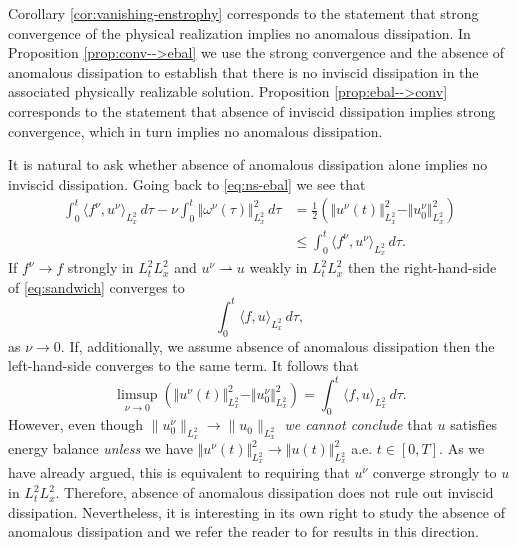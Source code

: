 \documentclass[reqno,12pt]{amsart}
\begin{document}
\begin{remark} \label{rem:invdissANDnoanomdiss}
Corollary \ref{cor:vanishing-enstrophy} corresponds to the statement that strong convergence of the physical realization implies no anomalous dissipation. In Proposition \ref{prop:conv-->ebal} we use the strong convergence and the absence of anomalous dissipation to establish that there is no inviscid dissipation in the associated physically realizable solution. Proposition \ref{prop:ebal-->conv} corresponds to the statement that absence of inviscid dissipation implies strong convergence, which in turn implies no anomalous dissipation.

It is natural to ask whether absence of anomalous dissipation alone implies no inviscid dissipation. Going back to \eqref{eq:ns-ebal} we see that
\begin{align} \label{eq:sandwich}
\int_0^t \langle f^\nu, u^\nu \rangle_{L^2_x} \, d\tau  - \nu \int_0^t \Vert \omega^\nu(\tau) \Vert^2_{L^2_x} \, d\tau & = \frac12\left(\Vert u^\nu(t) \Vert^2_{L^2_x}
  - \Vert u_0^\nu \Vert_{L^2_x}^2\right)\\
& \leq
  \int_0^t \langle f^\nu, u^\nu \rangle_{L^2_x} \, d\tau   . \nonumber
\end{align}
If $f^\nu \to f$ strongly in $L^2_t L^2_x$ and $u^\nu \rightharpoonup u$ weakly in $L^2_t L^2_x$ then the right-hand-side of \eqref{eq:sandwich} converges to
\[\int_0^t \langle f , u  \rangle_{L^2_x} \, d\tau ,\]
as $\nu \to 0$. If, additionally, we assume absence of anomalous dissipation then the left-hand-side converges to the same term. It follows that
\begin{equation} \label{eq:invdissANDnoanomdiss}
\limsup_{\nu \to 0} \left( \Vert u^\nu(t) \Vert^2_{L^2_x}
  - \Vert u_0^\nu \Vert_{L^2_x}^2 \right) = \int_0^t \langle f , u  \rangle_{L^2_x} \, d\tau.
\end{equation}
However, even though $\| u_0^\nu \|_{L^2_x} \to \| u_0 \|_{L^2_x}$ {\em we cannot conclude} that $u$ satisfies energy balance {\em unless} we have $\Vert u^\nu(t) \Vert^2_{L^2_x} \to \Vert u (t) \Vert^2_{L^2_x}$ a.e. $t \in [0,T]$. As we have already argued, this is equivalent to requiring that $u^\nu$ converge strongly to $u$ in $L^2_t L^2_x$. Therefore, absence of anomalous dissipation does not rule out inviscid dissipation. Nevertheless, it is interesting in its own right to study the absence of anomalous dissipation and we refer the reader to \cite{DeRosaPark2024} for results in this direction.
\end{remark}
\end{document}
